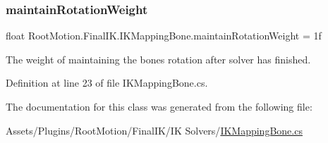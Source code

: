 \subsubsection{\texorpdfstring{maintain\+Rotation\+Weight}{maintainRotationWeight}}
{\footnotesize\ttfamily float Root\+Motion.\+Final\+I\+K.\+I\+K\+Mapping\+Bone.\+maintain\+Rotation\+Weight = 1f}



The weight of maintaining the bone\textquotesingle{}s rotation after solver has finished. 



Definition at line 23 of file I\+K\+Mapping\+Bone.\+cs.



The documentation for this class was generated from the following file\+:\begin{DoxyCompactItemize}
\item 
Assets/\+Plugins/\+Root\+Motion/\+Final\+I\+K/\+I\+K Solvers/\mbox{\hyperlink{_i_k_mapping_bone_8cs}{I\+K\+Mapping\+Bone.\+cs}}\end{DoxyCompactItemize}
